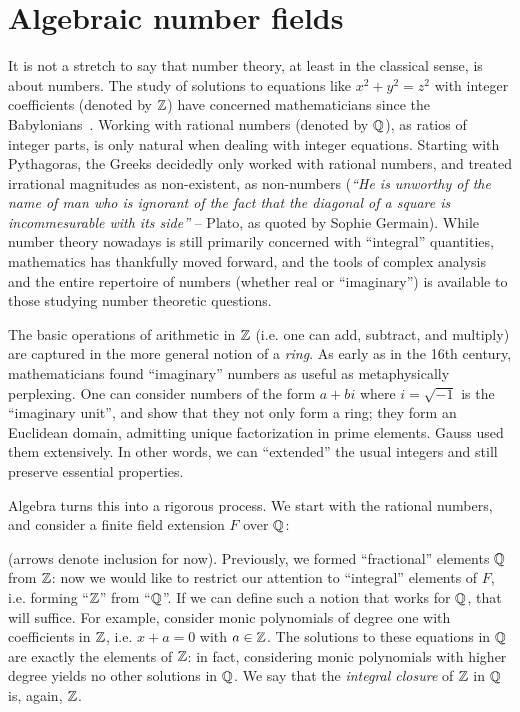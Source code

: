 \section{Algebraic number fields}

It is not a stretch to say that number theory, at least in the classical sense, is about numbers. The study of solutions to equations like $x^2+y^2=z^2$ with integer coefficients (denoted by $\mathbb{Z}$) have concerned mathematicians since the Babylonians~\cite{rouseball}. Working with rational numbers (denoted by $\mathbb{Q}$), as ratios of integer parts, is only natural when dealing with integer equations. Starting with Pythagoras, the Greeks decidedly only worked with rational numbers, and treated irrational magnitudes as non-existent, as non-numbers (\emph{``He is unworthy of the name of man who is ignorant of the fact that the diagonal of a square is incommesurable with its side''} -- Plato, as quoted by Sophie Germain). While number theory nowadays is still primarily concerned with ``integral'' quantities, mathematics has thankfully moved forward, and the tools of complex analysis and the entire repertoire of numbers (whether real or ``imaginary'') is available to those studying number theoretic questions.

The basic operations of arithmetic in $\mathbb{Z}$ (i.e. one can add, subtract, and multiply) are captured in the more general notion of a \emph{ring}. As early as in the 16th century, mathematicians found ``imaginary'' numbers as useful as metaphysically perplexing. One can consider numbers of the form $a+bi$ where $i=\sqrt{-1}$ is the ``imaginary unit'', and show that they not only form a ring; they form an Euclidean domain, admitting unique factorization in prime elements. Gauss used them extensively. In other words, we can ``extended'' the usual integers and still preserve essential properties.

Algebra turns this into a rigorous process. We start with the rational numbers, and consider a finite field extension $F$ over $\mathbb{Q}$:
\begin{center}
\end{center}
(arrows denote inclusion for now). Previously, we formed ``fractional'' elements $\mathbb{Q}$ from $\mathbb{Z}$: now we would like to restrict our attention to ``integral'' elements of $F$, i.e. forming ``$\mathbb{Z}$'' from ``$\mathbb{Q}$''. If we can define such a notion that works for $\mathbb{Q}$, that will suffice. For example, consider monic polynomials of degree one with coefficients in $\mathbb{Z}$, i.e. $x+a=0$ with $a\in\mathbb{Z}$. The solutions to these equations in $\mathbb{Q}$ are exactly the elements of $\mathbb{Z}$: in fact, considering monic polynomials with higher degree yields no other solutions in $\mathbb{Q}$. We say that the \emph{integral closure} of $\mathbb{Z}$ in $\mathbb{Q}$ is, again, $\mathbb{Z}$.

